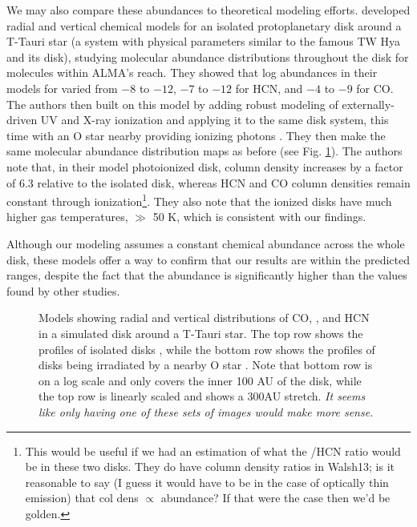 We may also compare these abundances to theoretical modeling efforts. \citet{Walsh2010} developed radial and vertical chemical models for an isolated protoplanetary disk around a T-Tauri star (a system with physical parameters similar to the famous TW Hya and its disk), studying molecular abundance distributions throughout the disk for molecules within ALMA's reach. They showed that log abundances in their models for \hco varied from $-8$ to $-12$, $-7$ to $-12$ for HCN, and $-4$ to $-9$ for CO. The authors then built on this model by adding robust modeling of externally-driven UV and X-ray ionization \citep{Walsh2012} and applying it to the same disk system, this time with an O star nearby providing ionizing photons \citep{Walsh2013}. They then make the same molecular abundance distribution maps as before (see Fig. \ref{fig:walsh-abundance-profs}). The authors note that, in their model photoionized disk, \hco column density increases by a factor of 6.3 relative to the isolated disk, whereas HCN and CO column densities remain constant through ionization\footnote{This would be useful if we had an estimation of what the \hco/HCN ratio would be in these two disks. They do have column density ratios in Walsh13; is it reasonable to say (I guess it would have to be in the case of optically thin emission) that col dens $\propto$ abundance? If that were the case then we'd be golden.}. They also note that the ionized disks have much higher gas temperatures, $\gg$ 50 K, which is consistent with our findings.


Although our modeling assumes a constant chemical abundance across the whole disk, these models offer a way to confirm that our results are within the predicted ranges, despite the fact that the \hco abundance is significantly higher than the values found by other studies.




\begin{figure}[t]
  \hspace*{\fill}%
  \vfill%
  \hspace*{\fill}%
  \caption{Models showing radial and vertical distributions of CO, \hco, and HCN in a simulated disk around a T-Tauri star. The top row shows the profiles of isolated disks \citep{Walsh2010}, while the bottom row shows the profiles of disks being irradiated by a nearby O star \citep{Walsh2013}. Note that bottom row is on a log scale and only covers the inner 100 AU of the disk, while the top row is linearly scaled and shows a 300AU stretch. \textit{It seems like only having one of these sets of images would make more sense.}}
  \label{fig:walsh-abundance-profs}
\end{figure}



